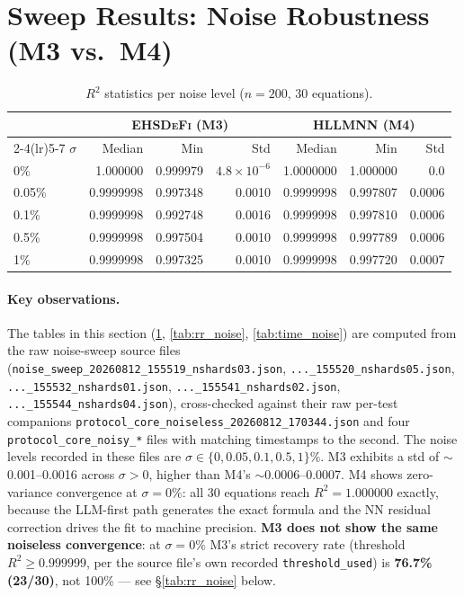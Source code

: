 \documentclass[twoside,11pt]{article}
\newcommand{\EHD}{\textsc{EHSDeFi}}
\newcommand{\HSL}{\textsc{HLLMNN}}
\newcommand{\Rsq}{R^{2}}
\begin{document}
\section{Sweep Results: Noise Robustness (M3 vs.\ M4)}
\label{sec:noise}

\begin{table}[H]
\centering
\caption{$\Rsq$ statistics per noise level ($n=200$, 30 equations).
}
\label{tab:r2_noise}
\renewcommand{\arraystretch}{1.2}
\small
\begin{tabular}{l r r r r r r}
\toprule
& \multicolumn{3}{c}{\textcolor{m3blue}{\textbf{\EHD{} (M3)}}}
& \multicolumn{3}{c}{\textcolor{m4red}{\textbf{\HSL{} (M4)}}}\\
\cmidrule(lr){2-4}\cmidrule(lr){5-7}
$\sigma$ & Median & Min & Std & Median & Min & Std\\
\midrule
0\%    & 1.000000 & 0.999979 & $4.8\times10^{-6}$ & 1.0000000 & 1.000000 & $0.0$\\
0.05\% & 0.9999998 & 0.997348 & 0.0010 & 0.9999998 & 0.997807 & 0.0006\\
0.1\%  & 0.9999998 & 0.992748 & 0.0016 & 0.9999998 & 0.997810 & 0.0006\\
0.5\%  & 0.9999998 & 0.997504 & 0.0010 & 0.9999998 & 0.997789 & 0.0006\\
1\%    & 0.9999998 & 0.997325 & 0.0010 & 0.9999998 & 0.997720 & 0.0007\\
\bottomrule
\end{tabular}
\end{table}

\paragraph{Key observations.} The tables in this section (\ref{tab:r2_noise}, \ref{tab:rr_noise}, \ref{tab:time_noise}) are computed from the raw noise-sweep source files (\texttt{noise\_sweep\_20260812\_155519\_nshards03.json}, \texttt{...\_155520\_nshards05.json}, \texttt{...\_155532\_nshards01.json}, \texttt{...\_155541\_nshards02.json}, \texttt{...\_155544\_nshards04.json}), cross-checked against their raw per-test companions \texttt{protocol\_core\_noiseless\_20260812\_170344.json} and four \texttt{protocol\_core\_noisy\_*} files with matching timestamps to the second. The noise levels recorded in these files are $\sigma\in\{0, 0.05, 0.1, 0.5, 1\}\%$. M3 exhibits a std of $\sim$0.001--0.0016 across $\sigma>0$, higher
than M4's $\sim$0.0006--0.0007. M4 shows zero-variance convergence at
$\sigma=0\%$: all 30 equations reach $\Rsq=1.000000$ exactly, because the
LLM-first path generates the exact formula and the NN residual correction
drives the fit to machine precision. \textbf{M3 does not show the same
noiseless convergence}: at $\sigma=0\%$ M3's strict recovery rate
(threshold $\Rsq\geq0.999999$, per the source file's own recorded
\texttt{threshold\_used}) is \textbf{76.7\% (23/30)}, not 100\% --- see \S\ref{tab:rr_noise} below.
\end{document}
